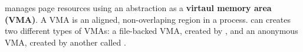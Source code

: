 \label{sec:abi:memory}




\Thehostabi{} manages page resources using an abstraction as 
a {\bf virtaul memory area (VMA)}. A VMA is an aligned, non-overlaping region
in a process. %
\Thehostabi{} can creates
two different types of VMAs: a file-backed VMA, created by , and an anonymous VMA, created by another \hostapi{} called .










